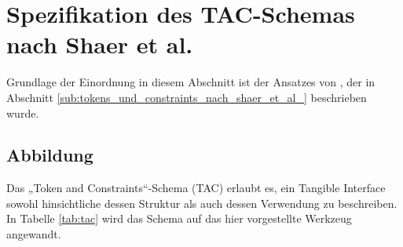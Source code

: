 
\section{Spezifikation des TAC-Schemas nach Shaer et al.} %
\label{sec:spezifikation_des_tac_schemas_nach_shaer_et_al_}

Grundlage der Einordnung in diesem Abschnitt ist der Ansatzes von \citet{Shaer04}, der in Abschnitt \ref{sub:tokens_und_constraints_nach_shaer_et_al_} beschrieben wurde.

\subsection{Abbildung} %

Das „Token and Constraints“-Schema (\gls{TAC}) erlaubt es, ein Tangible Interface sowohl hinsichtliche dessen Struktur als auch dessen Verwendung zu beschreiben. In Tabelle \ref{tab:tac} wird das Schema auf das hier vorgestellte Werkzeug angewandt. 

